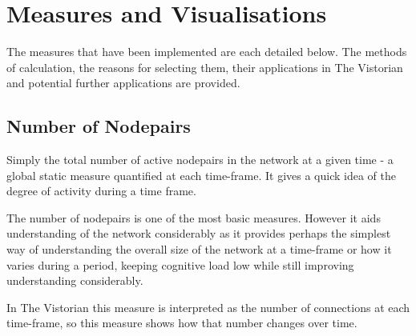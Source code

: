 \section{Measures and Visualisations}
The measures that have been implemented are each detailed below. The methods of calculation, the reasons for selecting them, their applications in The Vistorian and potential further applications are provided.

\subsection{Number of Nodepairs}
Simply the total number of active nodepairs in the network at a given time - a global static measure quantified at each time-frame. It gives a quick idea of the degree of activity during a time frame.

The number of nodepairs is one of the most basic measures. However it aids understanding of the network considerably as it provides perhaps the simplest way of understanding the overall size of the network at a time-frame or how it varies during a period, keeping cognitive load low while still improving understanding considerably.

In The Vistorian this measure is interpreted as the number of connections at each time-frame, so this measure shows how that number changes over time.


